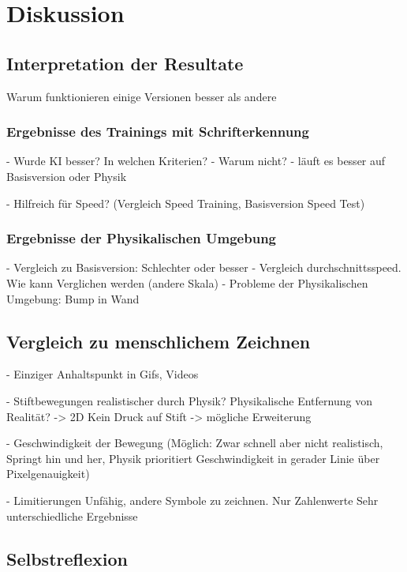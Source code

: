\chapter{Diskussion}

\section{Interpretation der Resultate}
Warum funktionieren einige Versionen besser als andere

\subsection*{Ergebnisse des Trainings mit Schrifterkennung}
- Wurde KI besser? In welchen Kriterien?
- Warum nicht?
- läuft es besser auf Basisversion oder Physik

- Hilfreich für Speed? (Vergleich Speed Training, Basisversion Speed Test)

\subsection*{Ergebnisse der Physikalischen Umgebung}
- Vergleich zu Basisversion: Schlechter oder besser
- Vergleich durchschnittsspeed. Wie kann Verglichen werden (andere Skala)
- Probleme der Physikalischen Umgebung: Bump in Wand

\section{Vergleich zu menschlichem Zeichnen}
- Einziger Anhaltspunkt in Gifs, Videos

- Stiftbewegungen realistischer durch Physik?
Physikalische Entfernung von Realität? -> 2D Kein Druck auf Stift -> mögliche Erweiterung

- Geschwindigkeit der Bewegung
    (Möglich: Zwar schnell aber nicht realistisch, Springt hin und her, Physik prioritiert Geschwindigkeit in gerader Linie über Pixelgenauigkeit)

- Limitierungen
    Unfähig, andere Symbole zu zeichnen. Nur Zahlenwerte
    Sehr unterschiedliche Ergebnisse


\section{Selbstreflexion}




